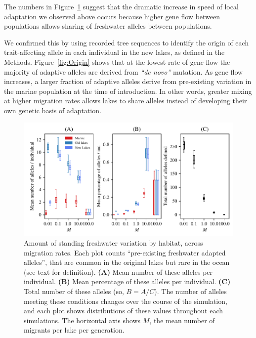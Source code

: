 \documentclass{article}
\begin{document}
The numbers in Figure~\ref{fig:MPFAI} suggest that the dramatic increase in speed of local adaptation we observed above occurs because higher gene flow between populations allows sharing of freshwater alleles between populations.


We confirmed this by using recorded tree sequences to identify the origin of each trait-affecting allele in each individual in the new lakes, as defined in the Methods. Figure~\ref{fig:Origin} shows that at the lowest rate of gene flow the majority of adaptive alleles are derived from \emph{``de novo''} mutation. As gene flow increases, a larger fraction of adaptive alleles derive from pre-existing variation in the marine population at the time of introduction. In other words, greater mixing at higher migration rates allows lakes to share alleles instead of developing their own genetic basis of adaptation.

\begin{figure}
    \begin{center}
          \includegraphics{Final_Plots/Freshwater_Alleles.pdf}
          \caption{
            Amount of standing freshwater variation by habitat, across migration rates.
            Each plot counts ``pre-existing freshwater adapted alleles'',
            that are common in the original lakes but rare in the ocean
            (see text for definition).
            \textbf{(A)} Mean number of these alleles per individual.
            \textbf{(B)} Mean percentage of these alleles per individual.
            \textbf{(C)} Total number of these alleles (so, $B = A/C$).
            The number of alleles meeting these conditions changes over the course of the simulation,
            and each plot shows distributions of these values throughout each simulations.
            The horizontal axis shows $M$, the mean number of migrants per lake per generation.}
        \label{fig:MPFAI}
    \end{center}
\end{figure}
\end{document}
